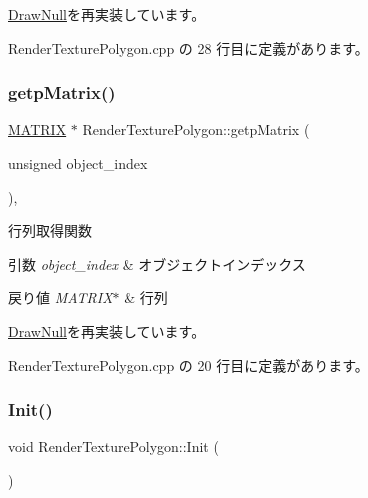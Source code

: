 \mbox{\hyperlink{class_draw_null_a0c1efe55fea325ad277594be6fe1e938}{Draw\+Null}}を再実装しています。



 Render\+Texture\+Polygon.\+cpp の 28 行目に定義があります。

\mbox{\label{class_render_texture_polygon_a76ab48dff0a23ee4db47da598f4d6a70}} 
\subsubsection{\texorpdfstring{getp\+Matrix()}{getpMatrix()}}
{\footnotesize\ttfamily \mbox{\hyperlink{_matrix_8h_a032295cd9fb1b711757c90667278e744}{M\+A\+T\+R\+IX}} $\ast$ Render\+Texture\+Polygon\+::getp\+Matrix (\begin{DoxyParamCaption}\item[{unsigned}]{object\+\_\+index }\end{DoxyParamCaption})\hspace{0.3cm}{\ttfamily [override]}, {\ttfamily [virtual]}}



行列取得関数 


\begin{DoxyParams}{引数}
{\em object\+\_\+index} & オブジェクトインデックス \\
\hline
\end{DoxyParams}

\begin{DoxyRetVals}{戻り値}
{\em M\+A\+T\+R\+I\+X$\ast$} & 行列 \\
\hline
\end{DoxyRetVals}


\mbox{\hyperlink{class_draw_null_a9aac059eb3b5d1f77e8bd3aa0647cff9}{Draw\+Null}}を再実装しています。



 Render\+Texture\+Polygon.\+cpp の 20 行目に定義があります。

\mbox{\label{class_render_texture_polygon_a623a232ed09b2bfca8c3557075044aac}} 
\subsubsection{\texorpdfstring{Init()}{Init()}}
{\footnotesize\ttfamily void Render\+Texture\+Polygon\+::\+Init (\begin{DoxyParamCaption}{ }\end{DoxyParamCaption})\hspace{0.3cm}{\ttfamily [virtual]}}



